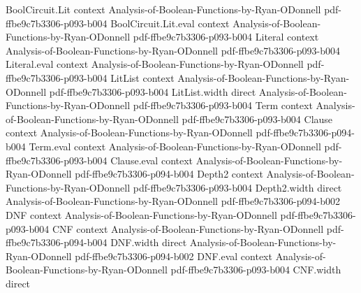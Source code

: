 \begin{lemma}
\label{BooleanAnalysis.noiseOp_self_adjoint}
\leanok
{}
\proofstep
  {BoolCircuit.Lit}
  {context}
  {Analysis-of-Boolean-Functions-by-Ryan-ODonnell}
  {pdf-ffbe9c7b3306-p093-b004}
\proofstep
  {BoolCircuit.Lit.eval}
  {context}
  {Analysis-of-Boolean-Functions-by-Ryan-ODonnell}
  {pdf-ffbe9c7b3306-p093-b004}
\proofstep
  {Literal}
  {context}
  {Analysis-of-Boolean-Functions-by-Ryan-ODonnell}
  {pdf-ffbe9c7b3306-p093-b004}
\proofstep
  {Literal.eval}
  {context}
  {Analysis-of-Boolean-Functions-by-Ryan-ODonnell}
  {pdf-ffbe9c7b3306-p093-b004}
\proofstep
  {LitList}
  {context}
  {Analysis-of-Boolean-Functions-by-Ryan-ODonnell}
  {pdf-ffbe9c7b3306-p093-b004}
\proofstep
  {LitList.width}
  {direct}
  {Analysis-of-Boolean-Functions-by-Ryan-ODonnell}
  {pdf-ffbe9c7b3306-p093-b004}
\proofstep
  {Term}
  {context}
  {Analysis-of-Boolean-Functions-by-Ryan-ODonnell}
  {pdf-ffbe9c7b3306-p093-b004}
\proofstep
  {Clause}
  {context}
  {Analysis-of-Boolean-Functions-by-Ryan-ODonnell}
  {pdf-ffbe9c7b3306-p094-b004}
\proofstep
  {Term.eval}
  {context}
  {Analysis-of-Boolean-Functions-by-Ryan-ODonnell}
  {pdf-ffbe9c7b3306-p093-b004}
\proofstep
  {Clause.eval}
  {context}
  {Analysis-of-Boolean-Functions-by-Ryan-ODonnell}
  {pdf-ffbe9c7b3306-p094-b004}
\proofstep
  {Depth2}
  {context}
  {Analysis-of-Boolean-Functions-by-Ryan-ODonnell}
  {pdf-ffbe9c7b3306-p093-b004}
\proofstep
  {Depth2.width}
  {direct}
  {Analysis-of-Boolean-Functions-by-Ryan-ODonnell}
  {pdf-ffbe9c7b3306-p094-b002}
\proofstep
  {DNF}
  {context}
  {Analysis-of-Boolean-Functions-by-Ryan-ODonnell}
  {pdf-ffbe9c7b3306-p093-b004}
\proofstep
  {CNF}
  {context}
  {Analysis-of-Boolean-Functions-by-Ryan-ODonnell}
  {pdf-ffbe9c7b3306-p094-b004}
\proofstep
  {DNF.width}
  {direct}
  {Analysis-of-Boolean-Functions-by-Ryan-ODonnell}
  {pdf-ffbe9c7b3306-p094-b002}
\proofstep
  {DNF.eval}
  {context}
  {Analysis-of-Boolean-Functions-by-Ryan-ODonnell}
  {pdf-ffbe9c7b3306-p093-b004}
\proofstep
  {CNF.width}
  {direct}

\end{lemma}
